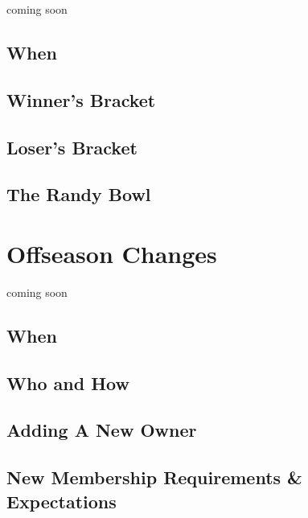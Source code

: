 \documentclass[]{book}
\begin{document}
coming soon

\hypertarget{when}{%
\section{When}\label{when}}

\hypertarget{winners-bracket}{%
\section{Winner's Bracket}\label{winners-bracket}}

\hypertarget{losers-bracket}{%
\section{Loser's Bracket}\label{losers-bracket}}

\hypertarget{the-randy-bowl}{%
\section{The Randy Bowl}\label{the-randy-bowl}}

\hypertarget{offseason-changes}{%
\chapter{Offseason Changes}\label{offseason-changes}}

coming soon

\hypertarget{when-1}{%
\section{When}\label{when-1}}

\hypertarget{who-and-how}{%
\section{Who and How}\label{who-and-how}}

\hypertarget{adding-a-new-owner}{%
\section{Adding A New Owner}\label{adding-a-new-owner}}

\hypertarget{new-membership-requirements-expectations}{%
\section{New Membership Requirements \& Expectations}\label{new-membership-requirements-expectations}}
\end{document}
